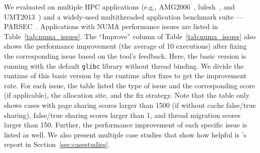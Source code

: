 We evaluated \NP{} on multiple HPC applications (e.g., \sloppy AMG2006~\cite{AMG2006}, lulesh~\cite{LULESH}, and UMT2013~\cite{UMT2013}) and a widely-used multithreaded application benchmark suite --- PARSEC~\cite{parsec}.  Applications with NUMA performance issues are listed in Table~\ref{tab:numa_issues}. The ``Improve'' column of Table~\ref{tab:numa_issues} also shows the performance improvement (the average of 10 executions) after fixing the corresponding issue based on the tool's feedback. Here, the basic version is running with the default \texttt{glibc} library  without thread binding. We divide the runtime of this basic version by the runtime after fixes to get the improvement rate. For each issue, the table listed the type of issue and the corresponding score (if applicable), the allocation site, and the fix strategy. Note that the table only shows cases with  page sharing scores larger than 1500 (if without cache false/true sharing), false/true sharing scores larger than 1, and thread migration scores larger than 150. Further, the performance improvement of each specific issue is listed as well. We also present multiple case studies that show how helpful is \NP{}'s report in Section~\ref{sec:casestudies}.   

